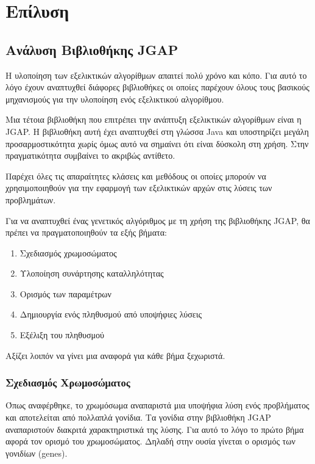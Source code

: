 \section{Επίλυση}

\subsection{Ανάλυση Βιβλιοθήκης JGAP}

Η υλοποίηση των εξελικτικών αλγορίθμων απαιτεί πολύ χρόνο και κόπο. Για αυτό το λόγο έχουν αναπτυχθεί διάφορες βιβλιοθήκες οι οποίες παρέχουν όλους τους βασικούς  μηχανισμούς για την υλοποίηση ενός εξελικτικού αλγορίθμου.

Μια τέτοια βιβλιοθήκη που επιτρέπει την ανάπτυξη εξελικτικών αλγορίθμων είναι η JGAP. Η βιβλιοθήκη αυτή έχει αναπτυχθεί στη γλώσσα Java και υποστηρίζει μεγάλη προσαρμοστικότητα χωρίς όμως αυτό να σημαίνει ότι είναι δύσκολη στη χρήση. Στην πραγματικότητα συμβαίνει το ακριβώς αντίθετο.

Παρέχει όλες τις απαραίτητες κλάσεις και μεθόδους οι οποίες μπορούν να χρησιμοποιηθούν για την εφαρμογή των εξελικτικών αρχών στις λύσεις των προβλημάτων. \cite{Meffert}

Για να αναπτυχθεί ένας γενετικός αλγόριθμος με τη χρήση της βιβλιοθήκης JGAP, θα πρέπει να πραγματοποιηθούν τα εξής βήματα: \cite{zotero-R7UV9N25}
\begin{enumerate}
  \item Σχεδιασμός χρωμοσώματος
  \item Υλοποίηση συνάρτησης καταλληλότητας
  \item Ορισμός των παραμέτρων
  \item Δημιουργία ενός πληθυσμού από υποψήφιες λύσεις
  \item Εξέλιξη του πληθυσμού
\end{enumerate}

Αξίζει λοιπόν να γίνει μια αναφορά για κάθε βήμα ξεχωριστά.

\subsubsection{Σχεδιασμός Χρωμοσώματος}

Όπως αναφέρθηκε, το χρωμόσωμα αναπαριστά μια υποψήφια λύση ενός προβλήματος και αποτελείται από πολλαπλά γονίδια. Τα γονίδια στην βιβλιοθήκη JGAP αναπαριστούν διακριτά χαρακτηριστικά της λύσης. Για αυτό το λόγο το πρώτο βήμα αφορά τον ορισμό του χρωμοσώματος. Δηλαδή στην ουσία γίνεται ο ορισμός των γονιδίων (genes).

